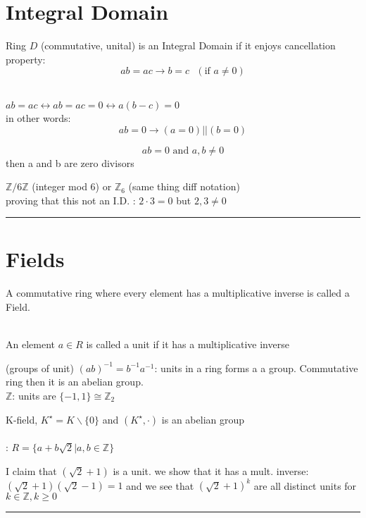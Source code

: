 \documentclass{article}
\begin{document}
\section{Integral Domain}
Ring $D$ (commutative, unital) is an Integral Domain if it enjoys cancellation property: $$ab= ac \rightarrow b = c \text{ } (\text{if } a \not = 0)$$
\begin{definition}[Equivalent]
    \leavevmode \\ 
    $ab = ac \longleftrightarrow ab = ac = 0 \longleftrightarrow a(b-c) =0$ \\ 
    in other words: $$ab = 0 \rightarrow (a = 0) || (b = 0)$$
\end{definition}
\begin{definition}
    $$ab= 0 \text{ and } a,b \not = 0 $$ then 
    a and b are zero divisors
\end{definition}
$\mathbb{Z}/6\mathbb{Z}$ (integer mod 6) or $\mathbb{Z}_6$ (same thing diff notation)
\\ proving that this not an I.D. : 
$2 \cdot 3 = 0$ but $2, 3 \not = 0$ \\ 
\noindent\rule{\textwidth}{0.5pt}

\section{Fields}
A commutative ring where every element has a multiplicative inverse is called a Field.
\begin{definition}[unit]
    \leavevmode \\ 
    An element $a \in R$ is called a unit if it has a multiplicative inverse

\end{definition}
(groups of unit) $(ab)^{-1}= b^{-1}a^{-1}$: units in a ring forms a a group. Commutative ring then it is an abelian group.  \\ 
 $\mathbb{Z}$: units are $\{-1, 1\} \cong \mathbb{Z}_2$


K-field, $K^{\star} = K \backslash \{0\}$ and $(K^{\star}, \cdot)$ is an abelian group  \\ \\ 
: $R = \{a + b\sqrt{2} | a,b \in \mathbb{Z}\}$ 

I claim that $(\sqrt{2} + 1)$ is a unit. we show that it has a mult. inverse: $(\sqrt{2} + 1)(\sqrt{2} - 1) = 1$ and we see that $(\sqrt{2} + 1)^k$ are all distinct units for $k \in \mathbb{Z}, k \geq 0$\\
\noindent\rule{\textwidth}{0.5pt}
\end{document}
